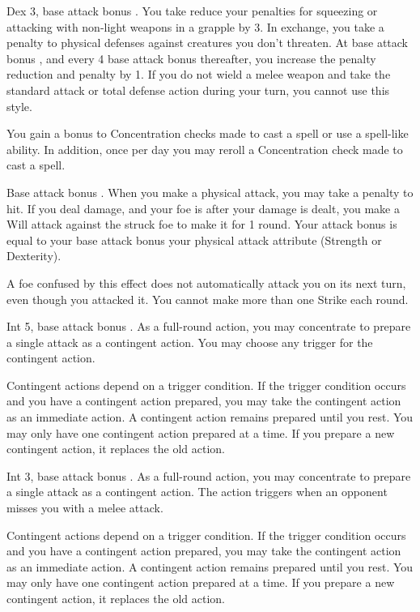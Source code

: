 \featpre Dex 3, base attack bonus .
\featben You take reduce your penalties for squeezing or attacking with non-light weapons in a grapple by 3. In exchange, you take a  penalty to physical defenses against creatures you don't threaten. At base attack bonus , and every 4 base attack bonus thereafter, you increase the penalty reduction and penalty by 1. If you do not wield a melee weapon and take the standard attack or total defense action during your turn, you cannot use this style.

 You gain a  bonus to Concentration checks made to cast a spell or use a spell-like ability. In addition, once per day you may reroll a Concentration check made to cast a spell.

\featpre Base attack bonus .
\featben When you make a physical attack, you may take a  penalty to hit. If you deal damage, and your foe is \bloodied after your damage is dealt, you make a Will attack against the struck foe to make it \confused for 1 round. Your attack bonus is equal to your base attack bonus \add your physical attack attribute (Strength or Dexterity).

A foe confused by this effect does not automatically attack you on its next turn, even though you attacked it. You cannot make more than one Strike each round.

\featpre Int 5, base attack bonus .
\featben As a full-round action, you may concentrate to prepare a single attack as a contingent action. You may choose any trigger for the contingent action.

Contingent actions depend on a trigger condition. If the trigger condition occurs and you have a contingent action prepared, you may take the contingent action as an immediate action. A contingent action remains prepared until you rest. You may only have one contingent action prepared at a time. If you prepare a new contingent action, it replaces the old action.

\featpre Int 3, base attack bonus .
\featben As a full-round action, you may concentrate to prepare a single attack as a contingent action. The action triggers when an opponent misses you with a melee attack.

Contingent actions depend on a trigger condition. If the trigger condition occurs and you have a contingent action prepared, you may take the contingent action as an immediate action. A contingent action remains prepared until you rest. You may only have one contingent action prepared at a time. If you prepare a new contingent action, it replaces the old action.

